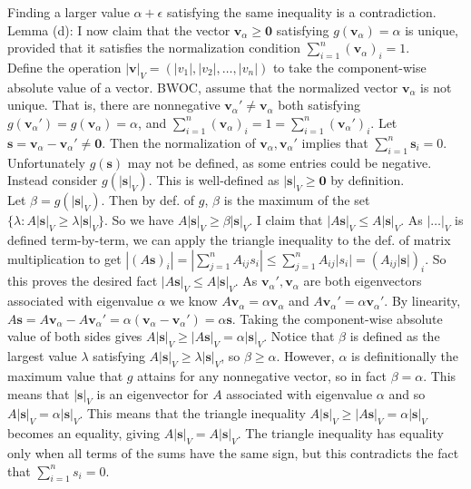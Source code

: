 \documentclass[14pt,letterpaper]{extarticle}
\newcommand*{\bv}{\mathbf{v}}
\newcommand*{\bs}{\mathbf{s}}
\newcommand*{\bvz}{\mathbf{0}}
\begin{document}
Finding a larger value $\alpha+\epsilon$ satisfying the same inequality is a contradiction. 
\vspace{5mm} \\
Lemma (d): I now claim that the vector $\bv_\alpha\ge \bvz$ satisfying $g(\bv_\alpha)=\alpha$ is unique, provided that it satisfies the normalization condition $\sum_{i=1}^n (\bv_\alpha)_i=1$. \\
Define the operation $|\bv|_V=(|v_1|,|v_2|,\dots,|v_n|)$ to take the component-wise absolute value of a vector. 
BWOC, assume that the normalized vector $\bv_\alpha$ is not unique.
That is, there are nonnegative $\bv_\alpha'\ne \bv_\alpha$ both satisfying $g(\bv_\alpha')=g(\bv_\alpha)=\alpha$, and $\sum_{i=1}^n (\bv_\alpha)_i=1=\sum_{i=1}^n (\bv_\alpha')_i$.
Let $\bs=\bv_\alpha-\bv_\alpha'\ne \bvz$.
Then the normalization of $\bv_\alpha,\bv_\alpha'$ implies that $\sum_{i=1}^n\bs_i=0$.
Unfortunately $g(\bs)$ may not be defined, as some entries could be negative.
Instead consider $g(|\bs|_V)$. This is well-defined as $|\bs|_V\ge \bvz$ by definition. \\
Let $\beta=g(|\bs|_V)$.
Then by def. of $g$, $\beta$ is the maximum of the set $\{\lambda:A|\bs|_V\ge \lambda|\bs|_V\}$.
So we have $A|\bs|_V \ge \beta|\bs|_V$.
I claim that $|A\bs|_V\le A|\bs|_V$.
As $|\dots|_V$ is defined term-by-term, we can apply the triangle inequality to the def. of matrix multiplication to get $|(A\bs)_i|=|\sum_{j=1}^nA_{ij}s_i|\le \sum_{j=1}^nA_{ij}|s_i|=(A_{ij}|\bs|)_i$.
So this proves the desired fact $|A\bs|_V\le A|\bs|_V$.
As $\bv_\alpha',\bv_\alpha$ are both eigenvectors associated with eigenvalue $\alpha$ we know $A\bv_\alpha=\alpha\bv_\alpha$ and $A\bv_\alpha'=\alpha\bv_\alpha'$.
By linearity, $A\bs=A\bv_\alpha-A\bv_\alpha'=\alpha(\bv_\alpha-\bv_\alpha')=\alpha\bs$. Taking the component-wise absolute value of both sides gives $A|\bs|_V\ge|A\bs|_V=\alpha|\bs|_V$. Notice that $\beta$ is defined as the largest value $\lambda$ satisfying $A|\bs|_V\ge \lambda |\bs|_V$, so $\beta \ge \alpha$. However, $\alpha$ is definitionally the maximum value that $g$ attains for any nonnegative vector, so in fact $\beta=\alpha$. This means that $|\bs|_V$ is an eigenvector for $A$ associated with eigenvalue $\alpha$ and so $A|\bs|_V=\alpha|\bs|_V$. This means that the triangle inequality $A|\bs|_V\ge|A\bs|_V=\alpha|\bs|_V$ becomes an equality, giving $A|\bs|_V=A|\bs|_V$. The triangle inequality has equality only when all terms of the sums have the same sign, but this contradicts the fact that $\sum_{i=1}^ns_i=0$. 
\end{document}
